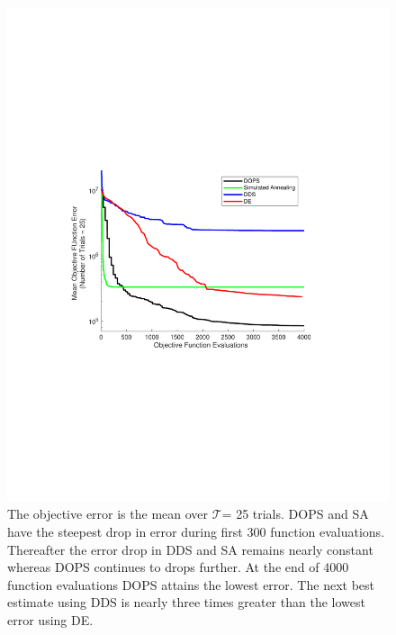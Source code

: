 \documentclass{bmcart}
\def\texttt{[image: ]}
\begin{document}
\begin{backmatter}
\begin{figure}[h!]
\centering
\includegraphics[trim = {3cm 8cm 3cm 7cm }, clip,width=1.0\textwidth]{./rachelfigs/RecreateFigure4.pdf}
\caption{ The objective error is the mean over $\mathcal{T}$= 25 trials.
DOPS and SA have the steepest drop in error during first 300 function evaluations. Thereafter the error drop in DDS and SA remains nearly constant whereas DOPS continues to drops further.
At the end of 4000 function evaluations DOPS attains the lowest error. The next best estimate using DDS is nearly three times greater than the lowest error using DE.
}\label{fig-convergence}
\end{figure}


\end{backmatter}
\end{document}
